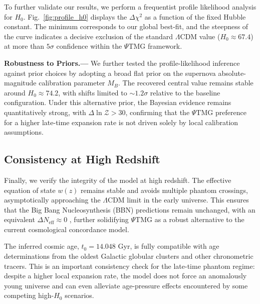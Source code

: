 \documentclass[10pt,twocolumn,secnumarabic,amssymb, nobibnotes, aps, prd, floatfix]{revtex4-2}
\begin{document}
To further validate our results, we perform a frequentist profile likelihood analysis for $H_0$. Fig.~\ref{fig:profile_h0} displays the $\Delta \chi^2$ as a function of the fixed Hubble constant. The minimum corresponds to our global best-fit, and the steepness of the curve indicates a decisive exclusion of the standard $\Lambda$CDM value ($H_0 \approx 67.4$) at more than $5\sigma$ confidence within the $\Psi$TMG framework.

\noindent \textbf{Robustness to Priors.---}
We further tested the profile-likelihood inference against prior choices by adopting a broad flat prior on the supernova absolute-magnitude calibration parameter $M_B$. The recovered central value remains stable around $H_0 \approx 74.2$, with shifts limited to $\sim 1.2\sigma$ relative to the baseline configuration. Under this alternative prior, the Bayesian evidence remains quantitatively strong, with $\Delta \ln \mathcal{Z} > 30$, confirming that the $\Psi$TMG preference for a higher late-time expansion rate is not driven solely by local calibration assumptions.

\subsection{Consistency at High Redshift}

Finally, we verify the integrity of the model at high redshift. The effective equation of state $w(z)$ remains stable and avoids multiple phantom crossings, asymptotically approaching the $\Lambda$CDM limit in the early universe. This ensures that the Big Bang Nucleosynthesis (BBN) predictions remain unchanged, with an equivalent $\Delta N_{\text{eff}} \approx 0$ \cite{Pitrou2018BBN,Aver2015HePrimordial,Cooke2018Deuterium}, further solidifying $\Psi$TMG as a robust alternative to the current cosmological concordance model.

The inferred cosmic age, $t_0 = 14.048$ Gyr, is fully compatible with age determinations from the oldest Galactic globular clusters and other chronometric tracers. This is an important consistency check for the late-time phantom regime: despite a higher local expansion rate, the model does not force an anomalously young universe and can even alleviate age-pressure effects encountered by some competing high-$H_0$ scenarios.
\end{document}

